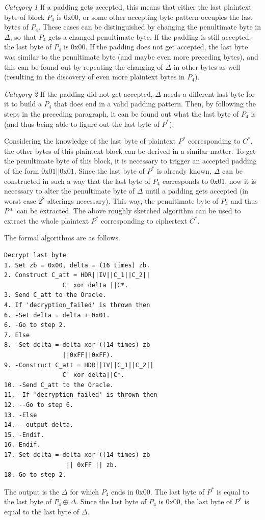 \documentclass[10pt,conference,a4paper]{IEEEtran}
\begin{document}
\textit{Category 1} If a padding gets accepted, this means that either the last plaintext byte of block $P_4$ is $0\text{x}00$, or some other accepting byte pattern occupies the last bytes of $P_4$. These cases can be distinguished by changing the penultimate byte in $\Delta$, so that $P_4$ gets a changed penultimate byte. If the padding is still accepted, the last byte of $P_4$ is $0\text{x}00$. If the padding does not get accepted, the last byte was similar to the penultimate byte (and maybe even more preceding bytes), and this can be found out by repeating the changing of $\Delta$ in other bytes as well (resulting in the discovery of even more plaintext bytes in $P_4$).

\textit{Category 2} If the padding did not get accepted, $\Delta$ needs a different last byte for it to build a $P_4$ that does end in a valid padding pattern. Then, by following the steps in the preceding paragraph, it can be found out what the last byte of $P_4$ is (and thus being able to figure out the last byte of $P^{*}$).

Considering the knowledge of the last byte of plaintext $P^{*}$ corresponding to $C^{*}$, the other bytes of this plaintext block can be derived in a similar matter. To get the penultimate byte of this block, it is necessary to trigger an accepted padding of the form $0\text{x}01||0\text{x}01$. Since the last byte of $P^{*}$ is already known, $\Delta$ can be constructed in such a way that the last byte of $P_4$ corresponds to $0\text{x}01$, now it is necessary to alter the penultimate byte of $\Delta$ until a padding gets accepted (in worst case $2^8$ alterings necessary). This way, the penultimate byte of $P_4$ and thus $P{*}$ can be extracted. The above roughly sketched algorithm can be used to extract the whole plaintext $P^{*}$ corresponding to ciphertext $C^{*}$.

The formal algorithms are as follows.
\begin{verbatim}
Decrypt last byte
1. Set zb = 0x00, delta = (16 times) zb.
2. Construct C_att = HDR||IV||C_1||C_2||
                C' xor delta ||C*.
3. Send C_att to the Oracle.
4. If 'decryption_failed' is thrown then
6. -Set delta = delta + 0x01.
6. -Go to step 2.
7. Else
8. -Set delta = delta xor ((14 times) zb
                ||0xFF||0xFF).
9. -Construct C_att = HDR||IV||C_1||C_2||
                C' xor delta||C*.
10. -Send C_att to the Oracle.
11. -If 'decryption_failed' is thrown then
12. --Go to step 6.
13. -Else
14. --output delta.
15. -Endif.
16. Endif.
17. Set delta = delta xor ((14 times) zb
                 || 0xFF || zb.
18. Go to step 2.
\end{verbatim}
The output is the $\Delta$ for which $P_4$ ends in $0\text{x}00$. The last byte of $P^{*}$ is equal to the last byte of $P_4 \oplus \Delta$. Since the last byte of $P_4$ is $0\text{x}00$, the last byte of $P^{*}$ is equal to the last byte of $\Delta$.
\end{document}

